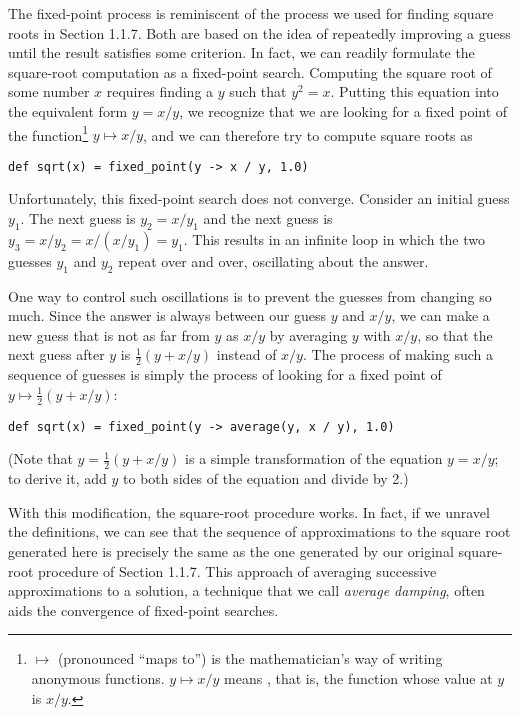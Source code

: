The fixed-point process is reminiscent of the process we used for finding square roots in Section 1.1.7. Both are based on the idea of repeatedly improving a guess until the result satisfies some criterion. In fact, we can readily formulate the square-root computation as a fixed-point search. Computing the square root of some number $x$ requires finding a $y$ such that $y^2 = x$. Putting this equation into the equivalent form $y = x/y$, we recognize that we are looking for a fixed point of the function\footnote{$\mapsto$ (pronounced ``maps to'') is the mathematician's way of writing anonymous functions. $y \mapsto x/y$ means , that is, the function whose value at $y$ is $x/y$.} $y \mapsto x/y$, and we can therefore try to compute square roots as

\begin{lstlisting}[style=slate]
def sqrt(x) = fixed_point(y -> x / y, 1.0)
\end{lstlisting}

Unfortunately, this fixed-point search does not converge. Consider an initial guess $y_1$. The next guess is $y_2 = x/y_1$ and the next guess is $y_3 = x/y_2 = x/(x/y_1) = y_1$. This results in an infinite loop in which the two guesses $y_1$ and $y_2$ repeat over and over, oscillating about the answer.

One way to control such oscillations is to prevent the guesses from changing so much. Since the answer is always between our guess $y$ and $x/y$, we can make a new guess that is not as far from $y$ as $x/y$ by averaging $y$ with $x/y$, so that the next guess after $y$ is $\frac{1}{2}(y + x/y)$ instead of $x/y$. The process of making such a sequence of guesses is simply the process of looking for a fixed point of $y \mapsto \frac{1}{2}(y + x/y)$:

\begin{lstlisting}[style=slate]
def sqrt(x) = fixed_point(y -> average(y, x / y), 1.0)
\end{lstlisting}

(Note that $y = \frac{1}{2}(y + x/y)$ is a simple transformation of the equation $y = x/y$; to derive it, add $y$ to both sides of the equation and divide by 2.)

With this modification, the square-root procedure works. In fact, if we unravel the definitions, we can see that the sequence of approximations to the square root generated here is precisely the same as the one generated by our original square-root procedure of Section 1.1.7. This approach of averaging successive approximations to a solution, a technique that we call \emph{average damping}, often aids the convergence of fixed-point searches.

